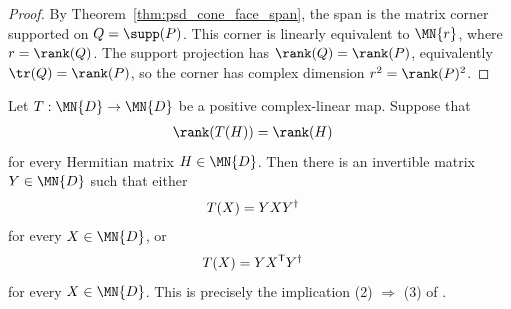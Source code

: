 \begin{proof}\leanok
    By Theorem~\ref{thm:psd_cone_face_span}, the span is the matrix corner
    supported on $Q=\supp(P)$. This corner is linearly equivalent to
    $\MN{r}$, where $r=\rank(Q)$. The support projection has
    $\rank(Q)=\rank(P)$, equivalently $\tr(Q)=\rank(P)$, so the corner has
    complex dimension $r^2=\rank(P)^2$.
\end{proof}

\begin{theorem}
    \label{thm:positive_hermitian_rank_preserver_standard_form}
    \leanok
    Let $T:\MN{D}\to\MN{D}$ be a positive complex-linear map. Suppose that
    \begin{align}
        \rank(T(H)) & =\rank(H)
        \notag
    \end{align}
    for every Hermitian matrix $H\in\MN{D}$. Then there is an invertible matrix
    $Y\in\MN{D}$ such that either
    \begin{align}
        T(X) & =YXY^\dagger
        \notag
    \end{align}
    for every $X\in\MN{D}$, or
    \begin{align}
        T(X) & =YX^{\mathsf T}Y^\dagger
        \notag
    \end{align}
    for every $X\in\MN{D}$. This is precisely the implication
    (2) $\Rightarrow$ (3) of \cite[Proposition~3.6]{Wolf2012Quantum}.
\end{theorem}

